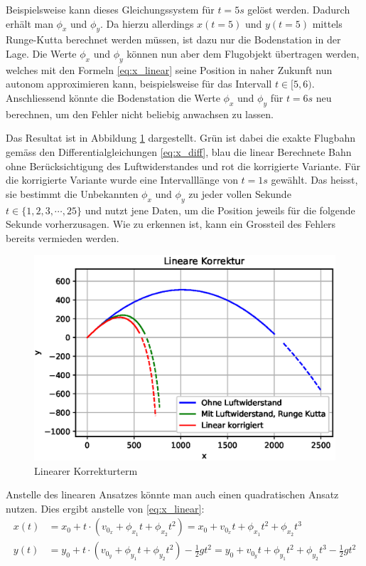 Beispielsweise kann dieses Gleichungssystem für $t = 5s$ gelöst werden.
Dadurch erhält man $\phi_x$ und $\phi_y$.
Da hierzu allerdings $x(t=5)$ und $y(t=5)$ mittels Runge-Kutta berechnet werden müssen, ist dazu nur die Bodenstation in der Lage.
Die Werte $\phi_x$ und $\phi_y$ können nun aber dem Flugobjekt übertragen werden,
welches mit den Formeln \eqref{eq:x_linear} seine Position in naher Zukunft nun autonom approximieren kann,
beispielsweise für das Intervall $t \in [5,6)$.
Anschliessend könnte die Bodenstation die Werte $\phi_x$ und $\phi_y$ für $t=6s$ neu berechnen, um den Fehler nicht beliebig anwachsen zu lassen.

Das Resultat ist in Abbildung \ref{naive_linear_term} dargestellt.
Grün ist dabei die exakte Flugbahn gemäss den Differentialgleichungen \eqref{eq:x_diff},
blau die linear Berechnete Bahn ohne Berücksichtigung des Luftwiderstandes und
rot die korrigierte Variante.
Für die korrigierte Variante wurde eine Intervalllänge von $t=1s$ gewählt.
Das heisst, sie bestimmt die Unbekannten $\phi_x$ und $\phi_y$ zu jeder vollen Sekunde $t \in \{1, 2, 3, \cdots, 25\}$ und nutzt jene Daten,
um die Position jeweils für die folgende Sekunde vorherzusagen.
Wie zu erkennen ist, kann ein Grossteil des Fehlers bereits vermieden werden.
\begin{figure}
    \centering
    \includegraphics[scale=0.7]{papers/perturbation/bilder/perturbation_fig1.eps}
    \caption{Linearer Korrekturterm}
	\label{naive_linear_term}
\end{figure}


Anstelle des linearen Ansatzes könnte man auch einen quadratischen Ansatz nutzen.
Dies ergibt anstelle von \eqref{eq:x_linear}:
\begin{equation}
\begin{aligned}
x(t) &= x_0 + t \cdot (v_{0_x} + \phi_{x_1}t + \phi_{x_2}t^2) = x_0 + v_{0_x}t + \phi_{x_1}t^2 + \phi_{x_2}t^3\\
y(t) &= y_0 + t \cdot (v_{0_y} + \phi_{y_1}t + \phi_{y_2}t^2) - \frac{1}{2}gt^2 = y_0 + v_{0_y}t + \phi_{y_1}t^2 + \phi_{y_2}t^3 - \frac{1}{2}gt^2
\end{aligned}
\end{equation}


